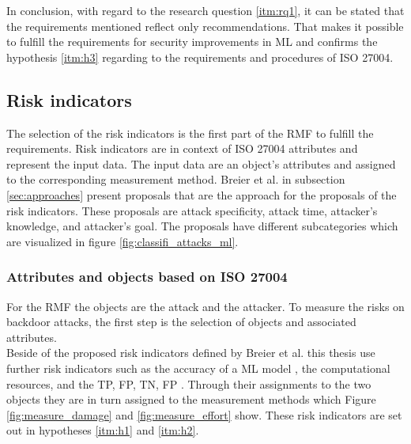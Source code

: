 In conclusion, with regard to the research question \ref{itm:rq1}, it can be stated that the requirements mentioned reflect only recommendations. That makes it possible to fulfill the requirements for security improvements in ML and confirms the hypothesis \ref{itm:h3} regarding to the requirements and procedures of ISO 27004.

\subsection{Risk indicators}
\label{sec:risk_indicators}

The selection of the risk indicators is the first part of the RMF to fulfill the requirements. Risk indicators are in context of ISO 27004 \cite{ISO_27004_2009} attributes and represent the input data. The input data are an object's attributes and assigned to the corresponding measurement method. Breier et al. \cite{DBLP:journals/corr/abs-2012-04884} in subsection \ref{sec:approaches} present proposals that are the approach for the proposals of the risk indicators. These proposals are attack specificity, attack time, attacker's knowledge, and attacker's goal. The proposals have different subcategories which are visualized in figure \ref{fig:classifi_attacks_ml}.

\subsubsection*{Attributes and objects based on ISO 27004}

For the RMF the objects are the attack and the attacker. To measure the risks on backdoor attacks, the first step is the selection of objects and associated attributes. \\ Beside of the proposed risk indicators defined by Breier et al. this thesis use further risk indicators such as the accuracy of a ML model \cite{DBLP:journals/soco/GarciaFLH09}, the computational resources, and the TP, FP, TN, FP \cite{DBLP:journals/symmetry/PhamJAADYPNLGPT20}. Through their assignments to the two objects they are in turn assigned to the measurement methods which Figure \ref{fig:measure_damage} and \ref{fig:measure_effort} show. These risk indicators are set out in hypotheses \ref{itm:h1} and \ref{itm:h2}.

